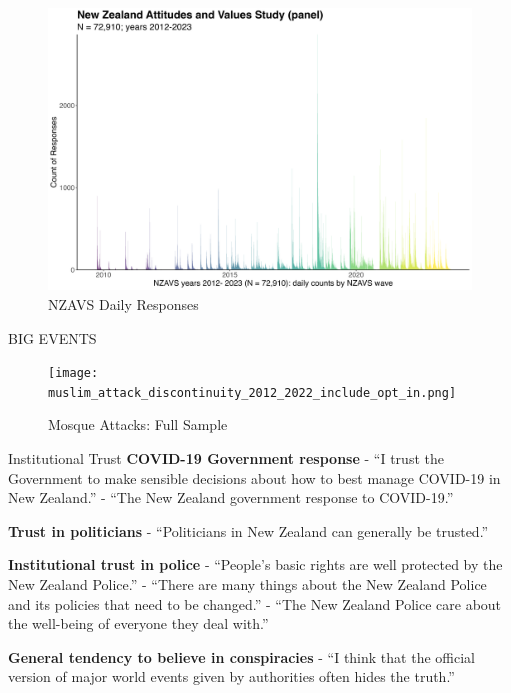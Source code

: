 \documentclass[
  ignorenonframetext,
  aspectratio=169,
]{beamer}
\begin{document}
\begin{frame}
\begin{figure}[H]

{\centering \includegraphics{timeline_histgram_2009_2024.png}

}

\caption{NZAVS Daily Responses}

\end{figure}%
\end{frame}

\begin{frame}
\LARGE \centering BIG EVENTS
\end{frame}

\begin{frame}
\begin{figure}[H]

{\centering \texttt{[image: muslim\_attack\_discontinuity\_2012\_2022\_include\_opt\_in.png]}

}

\caption{Mosque Attacks: Full Sample}

\end{figure}%
\end{frame}

\begin{frame}{Institutional Trust}
\label{institutional-trust}
\textbf{COVID-19 Government response} - ``I trust the Government to make
sensible decisions about how to best manage COVID-19 in New Zealand.'' -
``The New Zealand government response to COVID-19.''

\textbf{Trust in politicians} - ``Politicians in New Zealand can
generally be trusted.''

\textbf{Institutional trust in police} - ``People's basic rights are
well protected by the New Zealand Police.'' - ``There are many things
about the New Zealand Police and its policies that need to be changed.''
- ``The New Zealand Police care about the well-being of everyone they
deal with.''

\textbf{General tendency to believe in conspiracies} - ``I think that
the official version of major world events given by authorities often
hides the truth.''
\end{frame}
\end{document}
